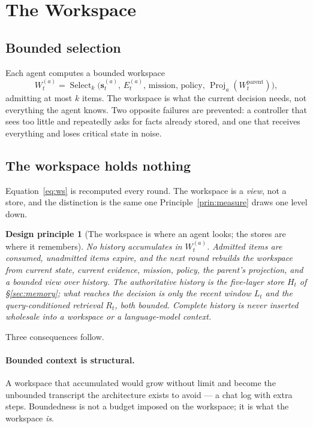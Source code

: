 \documentclass[11pt]{article}
\newtheorem{principle}{Design principle}
\newcommand{\Proj}{\operatorname{Proj}}
\newcommand{\Select}{\operatorname{Select}}
\begin{document}
\section{The Workspace}
\label{sec:workspace}

\subsection{Bounded selection}

Each agent computes a bounded workspace
\begin{equation}
W^{(a)}_t=\Select_{k}\big(\mathbf{s}^{(a)}_t,\,E^{(a)}_t,\,\text{mission},\,\text{policy},\,\Proj_a(W^{\mathrm{parent}}_t)\big),
\label{eq:ws}
\end{equation}
admitting at most $k$ items. The workspace is what the current decision needs, not everything the agent knows. Two opposite failures are prevented: a controller that sees too little and repeatedly asks for facts already stored, and one that receives everything and loses critical state in noise.

\subsection{The workspace holds nothing}
\label{sec:wsnostore}

Equation~\eqref{eq:ws} is recomputed every round. The workspace is a \emph{view}, not a store, and the distinction is the same one Principle~\ref{prin:measure} draws one level down.

\begin{principle}[The workspace is where an agent looks; the stores are where it remembers]
\label{prin:wsview}
No history accumulates in $W^{(a)}_t$. Admitted items are consumed, unadmitted items expire, and the next round rebuilds the workspace from current state, current evidence, mission, policy, the parent's projection, and a \emph{bounded view over history}. The authoritative history is the five-layer store $H_t$ of \S\ref{sec:memory}; what reaches the decision is only the recent window $L_t$ and the query-conditioned retrieval $R_t$, both bounded. Complete history is never inserted wholesale into a workspace or a language-model context.
\end{principle}

Three consequences follow.

\paragraph{Bounded context is structural.} A workspace that accumulated would grow without limit and become the unbounded transcript the architecture exists to avoid --- a chat log with extra steps. Boundedness is not a budget imposed on the workspace; it is what the workspace \emph{is}.
\end{document}
